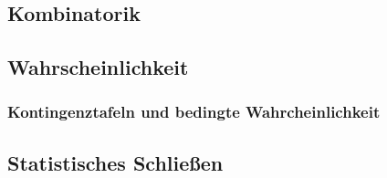 \setcounter{aufgabenNummer}{1}
  \renewcommand{\kAufgabenBuchstabe}{S}


\subsection{Kombinatorik}

\subsection{Wahrscheinlichkeit}

\subsubsection{Kontingenztafeln und bedingte Wahrcheinlichkeit}

\subsection{Statistisches Schließen}


\newpage
